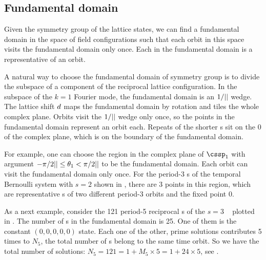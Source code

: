 

\subsection{Fundamental domain} %

Given the symmetry group of the lattice states,
we can find a fundamental domain in the space of field configurations 
such that each orbit in this space visits the fundamental domain only once.
Each {\lattstate} in the fundamental domain is a representative {\lattstate} of an
orbit.

A natural way to choose the fundamental domain of \Cn{\cl{}} symmetry group 
is to divide the subspace of a component of the reciprocal lattice configuration. 
In the subspace of the $k=1$ Fourier mode, the fundamental domain is an $1/{||}$
wedge. The lattice shift $d$ maps the fundamental domain by rotation and 
tiles the whole complex plane. Orbits visit the $1/{||}$ 
wedge only once, so the points in the fundamental domain represent an orbit each. 
Repeats of the shorter {\lattstate}s sit on the 0 of the complex plane, which is on 
the boundary of the fundamental domain.

For example, one can choose the region in the complex plane of $\cssp_1$ with 
argument $-\pi/2{||}\leq\theta_1<\pi/2{||}$ to be the fundamental domain.
Each orbit can visit the fundamental domain only once. For the period-3 {\lattstate}s
of the {temporal Bernoulli system} with $s=2$ shown in ,
there are 3 points in this region, which are representative {\lattstate}s of two different
period-3 orbits and the fixed point $0$.

As a next example, consider the 121 period-5 reciprocal {\lattstate}s
of the $s=3$ \templatt\  plotted in .
The number of {\lattstate}s in the fundamental domain is 25. One of
them is the constant $(0,0,0,0,0)$ state. Each one of the other, prime
solutions contributes 5 times to $N_5$, the total number of {\lattstate}s
belong to the same time orbit. So we have the total number of solutions:
$N_5=121=1+M_5\times5 = 1+24\times5$, see  .

